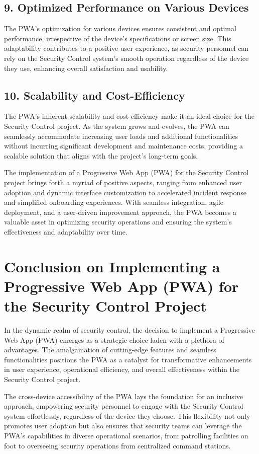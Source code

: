 \documentclass[journal]{IEEEtran}
\begin{document}
	\subsection*{9. Optimized Performance on Various Devices}
	The PWA's optimization for various devices ensures consistent and optimal performance, irrespective of the device's specifications or screen size. This adaptability contributes to a positive user experience, as security personnel can rely on the Security Control system's smooth operation regardless of the device they use, enhancing overall satisfaction and usability.
	
	\subsection*{10. Scalability and Cost-Efficiency}
	The PWA's inherent scalability and cost-efficiency make it an ideal choice for the Security Control project. As the system grows and evolves, the PWA can seamlessly accommodate increasing user loads and additional functionalities without incurring significant development and maintenance costs, providing a scalable solution that aligns with the project's long-term goals.
	
	The implementation of a Progressive Web App (PWA) for the Security Control project brings forth a myriad of positive aspects, ranging from enhanced user adoption and dynamic interface customization to accelerated incident response and simplified onboarding experiences. With seamless integration, agile deployment, and a user-driven improvement approach, the PWA becomes a valuable asset in optimizing security operations and ensuring the system's effectiveness and adaptability over time.
	
	\section*{Conclusion on Implementing a Progressive Web App (PWA) for the Security Control Project}
	In the dynamic realm of security control, the decision to implement a Progressive Web App (PWA) emerges as a strategic choice laden with a plethora of advantages. The amalgamation of cutting-edge features and seamless functionalities positions the PWA as a catalyst for transformative enhancements in user experience, operational efficiency, and overall effectiveness within the Security Control project.
	
	The cross-device accessibility of the PWA lays the foundation for an inclusive approach, empowering security personnel to engage with the Security Control system effortlessly, regardless of the device they choose. This flexibility not only promotes user adoption but also ensures that security teams can leverage the PWA's capabilities in diverse operational scenarios, from patrolling facilities on foot to overseeing security operations from centralized command stations.
	
\end{document}
